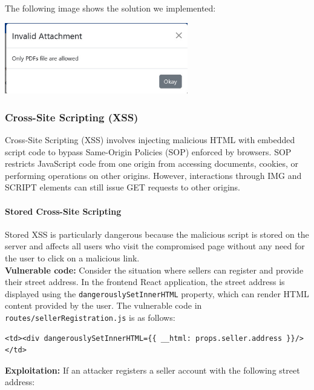 \documentclass[]{article}
\begin{document}
The following image shows the solution we implemented:
\begin{center} \includegraphics[width=8cm]{images/invalid_attachment.eps} 
\end{center}
\subsubsection{Cross-Site Scripting (XSS)}
\label{subsubsec:cross_site_scripting}
Cross-Site Scripting (XSS) involves injecting malicious HTML with embedded script code to bypass Same-Origin Policies (SOP) enforced by browsers. SOP restricts JavaScript code from one origin from accessing documents, cookies, or performing operations on other origins. However, interactions through IMG and SCRIPT elements can still issue GET requests to other origins. 

\paragraph{Stored Cross-Site Scripting}
\label{par:stored_xss}
Stored XSS is particularly dangerous because the malicious script is stored on the server and affects all users who visit the compromised page without any need for the user to click on a malicious link. \\
\textbf{Vulnerable code:}
Consider the situation where sellers can register and provide their street address. In the frontend React application, the street address is displayed using the \texttt{dangerouslySetInnerHTML} property, which can render HTML content provided by the user. The vulnerable code in \texttt{routes/sellerRegistration.js} is as follows:

\begin{lstlisting}
<td><div dangerouslySetInnerHTML={{ __html: props.seller.address }}/></td> 
\end{lstlisting} 
\textbf{Exploitation:}
If an attacker registers a seller account with the following street address:
\end{document}
